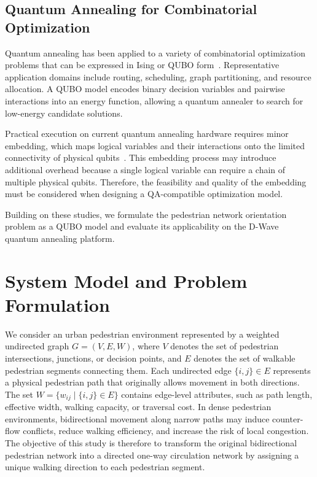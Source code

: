 \documentclass[twocolumn,a4paper]{article} %
\begin{document}
\subsection{Quantum Annealing for Combinatorial Optimization}
\label{subsec:related_qa}

Quantum annealing has been applied to a variety of combinatorial optimization problems that can be expressed in Ising or QUBO form~\cite{qa_for_optimize}. 
Representative application domains include routing, scheduling, graph partitioning, and resource allocation. 
A QUBO model encodes binary decision variables and pairwise interactions into an energy function, allowing a quantum annealer to search for low-energy candidate solutions.

Practical execution on current quantum annealing hardware requires minor embedding, which maps logical variables and their interactions onto the limited connectivity of physical qubits~\cite{minor_embedding_inQA2, minor_embedding_inQA}. 
This embedding process may introduce additional overhead because a single logical variable can require a chain of multiple physical qubits. 
Therefore, the feasibility and quality of the embedding must be considered when designing a QA-compatible optimization model.

Building on these studies, we formulate the pedestrian network orientation problem as a QUBO model and evaluate its applicability on the D-Wave quantum annealing platform.

\section{System Model and Problem Formulation} \label{sec:model}

We consider an urban pedestrian environment represented by a weighted undirected graph $ G=(V,E,W)$, where \(V\) denotes the set of pedestrian intersections, junctions, or decision points, and \(E\) denotes the set of walkable pedestrian segments connecting them. Each undirected edge \(\{i,j\}\in E\) represents a physical pedestrian path that originally allows movement in both directions. The set \(W=\{w_{ij}\mid \{i,j\}\in E\}\) contains edge-level attributes, such as path length, effective width, walking capacity, or traversal cost. In dense pedestrian environments, bidirectional movement along narrow paths may induce counter-flow conflicts, reduce walking efficiency, and increase the risk of local congestion. The objective of this study is therefore to transform the original bidirectional pedestrian network into a directed one-way circulation network by assigning a unique walking direction to each pedestrian segment.
\end{document}
